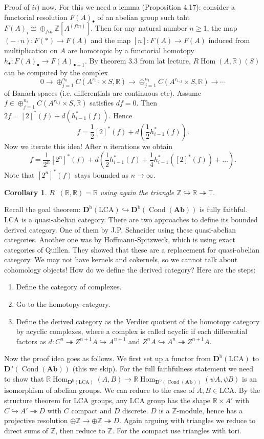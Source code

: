 \documentclass[12pt]{article}
\theoremstyle{darkgreentheorem}
\newtheorem{cor}[thm]{Corollary}
\theoremstyle{darkbluedefinition}
\theoremstyle{darkredexample}
\theoremstyle{remark}
\newcommand{\Z}{\mathbb{Z}}
\newcommand{\R}{\mathbb{R}}
\newcommand{\1}{\mathbbm{1}}
\newcommand{\bbT}{\mathbb{T}}
\newcommand{\Ab}{\mathbf{Ab}}
\newcommand{\Db}{\mathbf{D}^{\mathrm{b}}}
\DeclareMathOperator{\Hom}{Hom}
\DeclareMathOperator{\Cond}{Cond}
\DeclareMathOperator{\ihom}{\underline{Hom}}
\newcommand{\op}{\oplus}
\newcommand{\tms}{\times}
\newcommand{\epi}{\twoheadrightarrow}
\newcommand{\mono}{\hookrightarrow}
\newcommand{\LCA}{\mathrm{LCA}}
\begin{document}
Proof of $ii)$ now.
For this we need a lemma (Proposition 4.17): consider a functorial resolution $F(A)_{\bullet}$ of an abelian group such taht $F(A)_{i}\cong \op_{fin}\Z[A^{(fin)}]$.
Then for any natural number $n\geqslant 1$, the map $(-\cdot n)\colon F(*)\to F(A)$ and the map $[n]\colon F(A)\to F(A)$ induced from multiplication on $A$ are homotopic by a functorial homotopy $h_{\bullet}\colon F(A)_{\bullet}\to F(A)_{\bullet +1}$.
By theorem 3.3 from lat lecture, $R\Hom(A,\R)(S)$ can be computed by the complex
\[ 0\to \op_{j=1}^{n_{0}}C(A^{r_{0,j}}\tms S,\R)\to \op_{j=1}^{n_{1}}C(A^{r_{1,j}}\tms S,\R)\to \cdots \]
of Banach spaces (i.e. differentials are continuous etc).
Assume $f\in \op_{j=1}^{n_{i}}C(A^{r_{i,j}}\tms S,\R)$ satisfies $df=0$.
Then $2f=[2]^{*}(f)+d(h_{i-1}^{*}(f))$.
Hence
\[ f=\frac{1}{2}[2]^{*}(f)+d(\frac{1}{2}h_{i-1}^{*}(f)).\]
Now we iterate this idea!
After $n$ iterations we obtain
\[ f=\frac{1}{2^{n}}[2^{n}]^{*}(f)+d(\frac{1}{2}h_{i-1}^{*}(f)+\frac{1}{4}h_{i-1}^{*}([2]^{*}(f))+\ldots ). \]
Note that $[2^{n}]^{*}(f)$ stays bounded as $n\to \infty$.

\begin{cor}
    $R\ihom(\R,\R)=\R$ using again the triangle $\Z\mono\R\epi\bbT$.
\end{cor}

Recall the goal theorem: $\Db(\LCA)\mono \Db(\Cond(\Ab))$ is fully faithful.
$\LCA$ is a quasi-abelian category.
There are two approaches to define its bounded derived category.
One of them by J.P. Schneider using these quasi-abelian categories.
Another one was by Hoffmann-Spitzweck, which is using exact categories of Quillen.
They showed that these are a replacement for quasi-abelian category.
We may not have kernels and cokernels, so we cannot talk about cohomology objects!
How do we define the derived category?
Here are the steps:

\begin{enumerate}
    \item Define the category of complexes.
    \item Go to the homotopy category.
    \item Define the derived category as the Verdier quotient of the homotopy category by acyclic complexes, where a complex is called acyclic if each differential factors as $d\colon C^{n}\epi Z^{n+1}A\mono A^{n+1}$ and $Z^{n}A\mono A^{n}\epi Z^{n+1}A$.
\end{enumerate}

Now the proof idea goes as follows.
We first set up a functor from $\Db(\LCA)$ to $\Db(\Cond(\Ab))$ (this we skip).
For the full faithfulness statement we need to show that $\R\Hom_{\Db(\LCA)}(A,B)\to \R\Hom_{\Db(\Cond(\Ab))}(\psi A,\psi B)$ is an isomorphism of abelian groups.
We can reduce to the case of $A,B\in \LCA$.
By the structure theorem for $\LCA$ groups, any $\LCA$ group has the shape $\R\tms A'$ with $C\mono A'\epi D$ with $C$ compact and $D$ discrete.
$D$ is a $\Z$-module, hence has a projective resolution $\op \Z\to \op \Z\epi D$.
Again arguing with triangles we reduce to direct sums of $\Z$, then reduce to $\Z$.
For the compact use triangles with tori.
\end{document}
